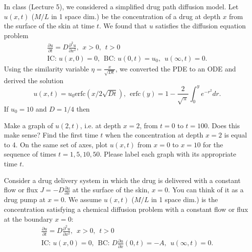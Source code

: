 \documentclass[
	number={3},
	title={}
]{math486homework}
\begin{document}
\maketitle

\begin{problems}
	\problem In class (Lecture 5), we considered a simplified drug path diffusion model.
	Let $u(x,t)$ ($M/L$ in 1 space dim.) be the concentration of a drug at depth $x$ from the surface of the skin at time $t$.
	We found that $u$ satisfies the diffusion equation problem
	\begin{equation*}
	\begin{aligned}
		\frac{\partial u}{\partial t} = D\frac{\partial^{2} u}{\partial x^{2}},\ \ x > 0,\ \ t > 0\\
		\mbox{IC: } u(x, 0) = 0,\ \ \mbox{BC: } u(0, t) = u_{0},\ \ u(\infty, t) = 0.
	\end{aligned}
	\end{equation*}
	Using the similarity variable $\eta = \frac{x}{\sqrt{Dt}}$, we converted the PDE to an ODE and derived the solution
	\begin{equation}
		u(x,t) = u_{0}\mbox{erfc}\left( x / 2\sqrt{Dt} \right),\ \ \mbox{erfc}(y) = 1 - \frac{2}{\sqrt{\pi}}\int_{0}^{y} e^{-r^{2}}dr.
		\label{eq:3.1}
	\end{equation}
	If $u_{0} = 10$ and $D = 1/4$ then
	\begin{problems}
		\subproblem Make a graph of $u(2,t)$, i.e. at depth $x=2$, from $t=0$ to $t=100$.
		Does this make sense? 
		\subproblem Find the first time $t$ when the concentration at depth $x=2$ is equal to 4. 
		\subproblem On the same set of axes, plot $u(x,t)$ from $x=0$ to $x=10$ for the sequence of times $t=1, 5, 10, 50$.
		Please label each graph with its appropriate time $t$. 
	\end{problems}
	\problem Consider a drug delivery system in which the drug is delivered with a constant flow or flux $J = -D\frac{\partial u}{\partial x}$ at the surface of the skin, $x=0$.
	You can think of it as a drug pump at $x=0$.
	We assume $u(x,t)$ ($M/L$ in 1 space dim.) is the concentration satisfying a chemical diffusion problem with a constant flow or flux at the boundary $x=0$:
	\begin{equation*}
		\begin{aligned}
			\frac{\partial u}{\partial t} = D\frac{\partial^{2} u}{\partial x^{2}},\ \ x > 0,\ \ t > 0\\
			\mbox{IC: } u(x, 0) = 0,\ \ \mbox{BC: } D\frac{\partial u}{\partial x}(0, t) = -A,\ \ u(\infty, t)=0.
		\end{aligned}
	\end{equation*}


\end{problems}
\end{document}
